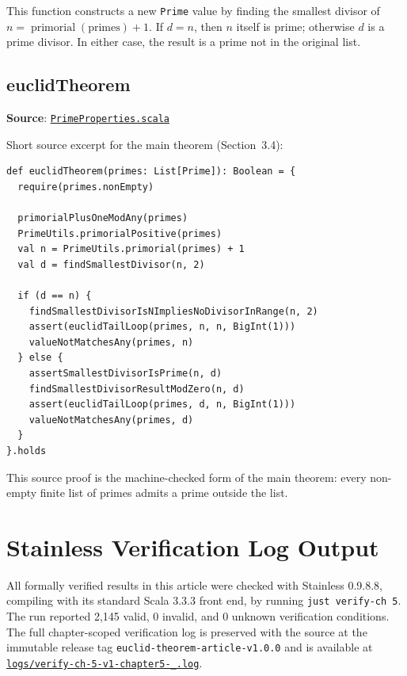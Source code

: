 {\raggedright
This function constructs a new \texttt{Prime} value by finding the
smallest divisor of $n = \operatorname{primorial}(\text{primes}) + 1$. If
$d = n$, then $n$ itself is prime; otherwise $d$ is a prime divisor. In
either case, the result is a prime not in the original list.
\par}

\subsection{euclidTheorem}

\textbf{Source}:
\href{https://github.com/thiagomata/prime-numbers/blob/euclid-theorem-article-v1.0.0/src/main/scala/v1/chapter5/prime/properties/PrimeProperties.scala}{\texttt{PrimeProperties.scala}}

Short source excerpt for the main theorem (Section~3.4):

\begin{lstlisting}[style=scala]
def euclidTheorem(primes: List[Prime]): Boolean = {
  require(primes.nonEmpty)

  primorialPlusOneModAny(primes)
  PrimeUtils.primorialPositive(primes)
  val n = PrimeUtils.primorial(primes) + 1
  val d = findSmallestDivisor(n, 2)

  if (d == n) {
    findSmallestDivisorIsNImpliesNoDivisorInRange(n, 2)
    assert(euclidTailLoop(primes, n, n, BigInt(1)))
    valueNotMatchesAny(primes, n)
  } else {
    assertSmallestDivisorIsPrime(n, d)
    findSmallestDivisorResultModZero(n, d)
    assert(euclidTailLoop(primes, d, n, BigInt(1)))
    valueNotMatchesAny(primes, d)
  }
}.holds
\end{lstlisting}

This source proof is the machine-checked form of the main theorem: every
non-empty finite list of primes admits a prime outside the list.

\section{Stainless Verification Log Output}
\label{sec:appendix-b}

All formally verified results in this article were checked with Stainless
0.9.8.8, compiling with its standard Scala 3.3.3 front end, by running
\texttt{just verify-ch 5}. The run reported 2,145 valid, 0 invalid, and 0
unknown verification conditions. The full chapter-scoped verification log is
preserved with the source at the immutable release tag
\texttt{euclid-theorem-article-v1.0.0} and is available at
\href{https://github.com/thiagomata/prime-numbers/blob/euclid-theorem-article-v1.0.0/logs/verify-ch-5-v1-chapter5-_.log}{\texttt{logs/verify-ch-5-v1-chapter5-\_.log}}.
